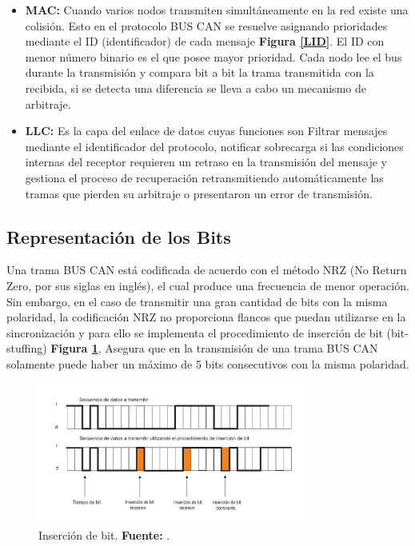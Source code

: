 \begin{itemize}
    \item \textbf{MAC:} Cuando varios nodos transmiten simultáneamente en la red existe una colisión. Esto en el protocolo BUS CAN se resuelve asignando prioridades mediante el ID (identificador) de cada mensaje \textbf{Figura \ref{LID}}. El ID con menor número binario es el que posee mayor prioridad. Cada nodo lee el bus durante la transmisión y compara bit a bit la trama transmitida con la recibida, si se detecta una diferencia se lleva a cabo un mecanismo de arbitraje.
    
    \item \textbf{LLC:} Es la capa del enlace de datos cuyas funciones son Filtrar mensajes mediante el identificador del protocolo, notificar sobrecarga si las condiciones internas del receptor requieren un retraso en la transmisión del mensaje y gestiona el proceso de recuperación retransmitiendo automáticamente las tramas que pierden su arbitraje o presentaron un error de transmisión.
\end{itemize}


\subsection{Representación de los Bits}

Una trama BUS CAN está codificada de acuerdo con el método NRZ (No Return Zero, por sus siglas en inglés), el cual produce una frecuencia de menor operación. Sin embargo, en el caso de transmitir una gran cantidad de bits con la misma polaridad, la codificación NRZ no proporciona flancos que puedan utilizarse en la sincronización y para ello se implementa el procedimiento de inserción de bit (bit-stuffing) \textbf{Figura \ref{IB}}, Asegura que en la transmisión de una trama BUS CAN solamente puede haber un máximo de 5 bits consecutivos con la misma polaridad.



\begin{figure}[H]
	\centering
		\includegraphics[width=0.8\textwidth]{./Cap2imagen/insercionbit.pdf}
	\caption[Inserción de bit.]{Inserción de bit.\textbf{ Fuente:} \cite{DSEEPC}.}
	\label{IB} %
\end{figure}

